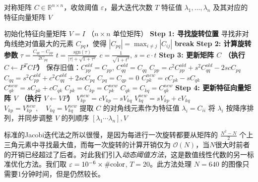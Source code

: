 	\begin{algorithm}[H]
		\caption{Jacobi 旋转法求解对称矩阵特征值与特征向量}
		\label{alg:jacobi}
		\begin{algorithmic}[1]
			\Require 对称矩阵 $C \in \mathbb{R}^{n \times n}$，收敛阈值 $\varepsilon$，最大迭代次数 $T$
			\Ensure 特征值 $\lambda_1, \dots, \lambda_n$ 及其对应的特征向量矩阵 $V$
			
			\State 初始化特征向量矩阵 $V = I$ （$n \times n$ 单位矩阵）
			\State \textbf{Step 1: 寻找旋转位置}
			\State 寻找非对角线绝对值最大的元素 $C_{pq}$，使得 $|C_{pq}| = \max_{i \neq j} |C_{ij}|$
			\State \textbf{break} 
			\EndIf
			\State
			\State \textbf{Step 2: 计算旋转参数}
			\State $\tau = \frac{C_{qq} - C_{pp}}{2C_{pq}}$
			\State $t = \frac{\text{sgn}(\tau)}{|\tau| + \sqrt{1 + \tau^2}}$ 
			\State $c = \frac{1}{\sqrt{1 + t^2}}$, \quad $s = c \cdot t$ 
			\State
			\State \textbf{Step 3: 更新矩阵 $C$ （执行 $C \leftarrow P^T C P$）}
			\State 保存旧值：$C_{pp}^{old} = C_{pp}$, \quad $C_{qq}^{old} = C_{qq}$
			\State $C_{pp} = c^2 C_{pp}^{old} + s^2 C_{qq}^{old} - 2sc C_{pq}$
			\State $C_{qq} = s^2 C_{pp}^{old} + c^2 C_{qq}^{old} + 2sc C_{pq}$
			\State $C_{pq} = C_{qp} = 0$
			\State $C_{pk}^{new} = c C_{pk} - s C_{qk}$
			\State $C_{qk}^{new} = s C_{pk} + c C_{qk}$
			\State $C_{pk} = C_{kp} = C_{pk}^{new}$
			\State $C_{qk} = C_{kq} = C_{qk}^{new}$
			\EndFor
			\State
			\State \textbf{Step 4: 更新特征向量矩阵 $V$ （执行 $V \leftarrow V P$）}
			\State $V_{kp}^{new} = c V_{kp} - s V_{kq}$
			\State $V_{kq}^{new} = s V_{kp} + c V_{kq}$
			\State $V_{kp} = V_{kp}^{new}, \quad V_{kq} = V_{kq}^{new}$
			\EndFor
			\EndFor
			\State 提取 $C$ 的对角线元素作为特征值 $\lambda_i = C_{ii}$
			\State 将 $\lambda_i$ 按降序排列，并同步调整 $V$ 的列顺序
			\State \Return $[\lambda_1 \cdots \lambda_n], V$
		\end{algorithmic}
	\end{algorithm}
	
	标准的Jacobi迭代法之所以很慢，是因为每进行一次旋转都要从矩阵的 $\frac{N^2 - N}{2}$ 个上三角元素中寻找最大值，而每一次旋转的计算开销仅为 $\mathcal{O}(N)$，当$N$很大时前者的开销已经超过了后者。对此我们引入\textit{动态阈值方法}，这是数值线性代数的另一标准优化方法。我们取 $\varepsilon = 10^{-6} \times \text{\#color}$, $T=20$。此方法处理 $ N = 640$ 的图像只需要1分钟时间，但是仍然较长。
	
